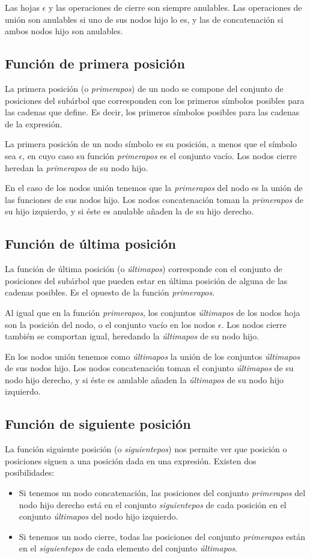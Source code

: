 Las hojas $ \epsilon $ y las operaciones de cierre son siempre anulables.
Las operaciones de unión son anulables si uno de sus nodos hijo lo es, y las de concatenación si ambos nodos hijo son anulables.

\subsection{Función de primera posición}
La primera posición (o \emph{primerapos}) de un nodo se compone del conjunto de posiciones del subárbol que corresponden con los primeros símbolos posibles para las cadenas que define.
Es decir, los primeros símbolos posibles para las cadenas de la expresión.

La primera posición de un nodo símbolo es su posición, a menos que el símbolo sea $ \epsilon $, en cuyo caso su función \emph{primerapos} es el conjunto vacío.
Los nodos cierre heredan la \emph{primerapos} de su nodo hijo.

En el caso de los nodos unión tenemos que la \emph{primerapos} del nodo es la unión de las funciones de sus nodos hijo.
Los nodos concatenación toman la \emph{primerapos} de su hijo izquierdo, y si éste es anulable añaden la de su hijo derecho.

\subsection{Función de última posición}
La función de última posición (o \emph{últimapos}) corresponde con el conjunto de posiciones del subárbol que pueden estar en última posición de alguna de las cadenas posibles.
Es el opuesto de la función \emph{primerapos}.

Al igual que en la función \emph{primerapos}, los conjuntos \emph{últimapos} de los nodos hoja son la posición del nodo, o el conjunto vacío en los nodos $ \epsilon $.
Los nodos cierre también se comportan igual, heredando la \emph{últimapos} de su nodo hijo.

En los nodos unión tenemos como \emph{últimapos} la unión de los conjuntos \emph{últimapos} de sus nodos hijo.
Los nodos concatenación toman el conjunto \emph{últimapos} de su nodo hijo derecho, y si éste es anulable añaden la \emph{últimapos} de su nodo hijo izquierdo.

\subsection{Función de siguiente posición}
La función siguiente posición (o \emph{siguientepos}) nos permite ver que posición o posiciones siguen a una posición dada en una expresión.
Existen dos posibilidades:
\begin{itemize}
	\item Si tenemos un nodo concatenación, las posiciones del conjunto \emph{primerapos} del nodo hijo derecho está en el conjunto \emph{siguientepos} de cada posición en el conjunto \emph{últimapos} del nodo hijo izquierdo.
	\item Si tenemos un nodo cierre, todas las posiciones del conjunto \emph{primerapos} están en el \emph{siguientepos} de cada elemento del conjunto \emph{últimapos}.
\end{itemize}

